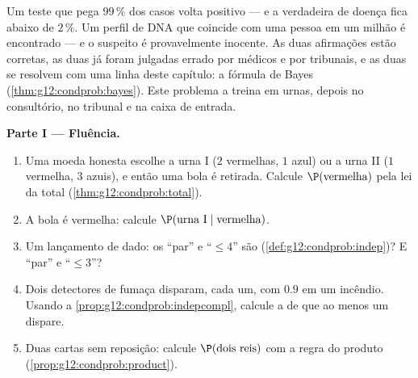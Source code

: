 \begin{problem}
\label{pb:g12:condprob:1}
Um teste que pega $99\,\%$ dos casos volta positivo --- e a
 verdadeira de doença fica abaixo de $2\,\%$. Um
perfil de DNA que coincide com uma pessoa em um milhão é
encontrado --- e o suspeito é provavelmente inocente. As duas
afirmações estão corretas, as duas já foram julgadas errado por
médicos e por tribunais, e as duas se resolvem com uma linha
deste capítulo: a fórmula de Bayes
(\cref{thm:g12:condprob:bayes}). Este problema a treina em
urnas, depois no consultório, no tribunal e na caixa de entrada.

\medskip
\noindent\textbf{Parte I --- Fluência.}
\begin{enumerate}
  \item Uma moeda honesta escolhe a urna I ($2$ vermelhas, $1$
        azul) ou a urna II ($1$ vermelha, $3$ azuis), e então
        uma bola é retirada. Calcule
        $\P(\text{vermelha})$ pela lei da  total
        (\cref{thm:g12:condprob:total}).
  \item A bola é vermelha: calcule $\P(\text{urna I} \mid
        \text{vermelha})$.
  \item Um lançamento de dado: os  ``par'' e
        ``$\leq 4$'' são 
        (\cref{def:g12:condprob:indep})? E ``par'' e
        ``$\leq 3$''?
  \item Dois detectores de fumaça  disparam, cada
        um, com  $0.9$ em um incêndio. Usando a
        \cref{prop:g12:condprob:indepcompl}, calcule a
         de que ao menos um dispare.
  \item Duas cartas sem reposição: calcule
        $\P(\text{dois reis})$ com a regra do produto
        (\cref{prop:g12:condprob:product}).
\end{enumerate}


\end{problem}
